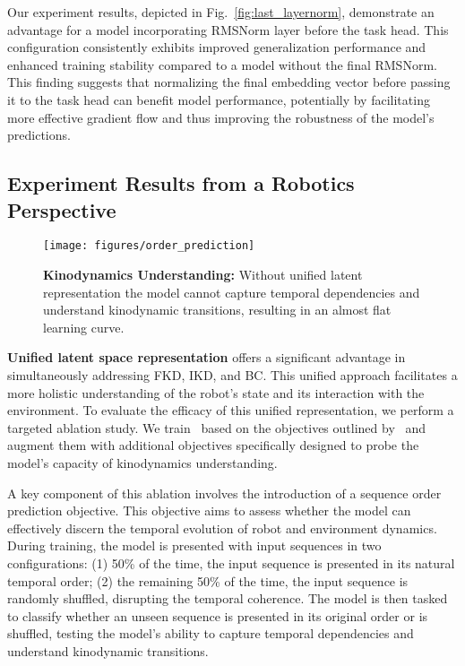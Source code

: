 Our experiment results, depicted in Fig.~\ref{fig:last_layernorm}, demonstrate an advantage for a model incorporating RMSNorm layer before the task head. This configuration consistently exhibits improved generalization performance and enhanced training stability compared to a model without the final RMSNorm. This finding suggests that normalizing the final embedding vector before passing it to the task head can benefit model performance, potentially by facilitating more effective gradient flow and thus improving the robustness of the model's predictions.


\subsection{Experiment Results from a Robotics Perspective} \label{sec:robotic_perspective}

\begin{figure}[h]
  \centering
  \texttt{[image: figures/order\_prediction]}
  \caption{\textbf{Kinodynamics Understanding:} Without unified latent representation the model cannot capture temporal dependencies and understand kinodynamic transitions, resulting in an almost flat learning curve.}
  \label{fig:unified_state}
\end{figure}
\textbf{Unified latent space representation} offers a significant advantage in simultaneously addressing FKD, IKD, and BC. This unified approach facilitates a more holistic understanding of the robot's state and its interaction with the environment. To evaluate the efficacy of this unified representation, we perform a targeted ablation study. We train \coder~based on the objectives outlined by~\citet{nazeri2024vertiencoder} and augment them with additional objectives specifically designed to probe the model's capacity of kinodynamics understanding. 

A key component of this ablation involves the introduction of a sequence order prediction objective. This objective aims to assess whether the model can effectively discern the temporal evolution of robot and environment dynamics. During training, the model is presented with input sequences in two configurations: (1) 50\% of the time, the input sequence is presented in its natural temporal order; (2) the remaining 50\% of the time, the input sequence is randomly shuffled, disrupting the temporal coherence. The model is then tasked to classify whether an unseen sequence is presented in its original order or is shuffled, testing the model's ability to capture temporal dependencies and understand kinodynamic transitions.

